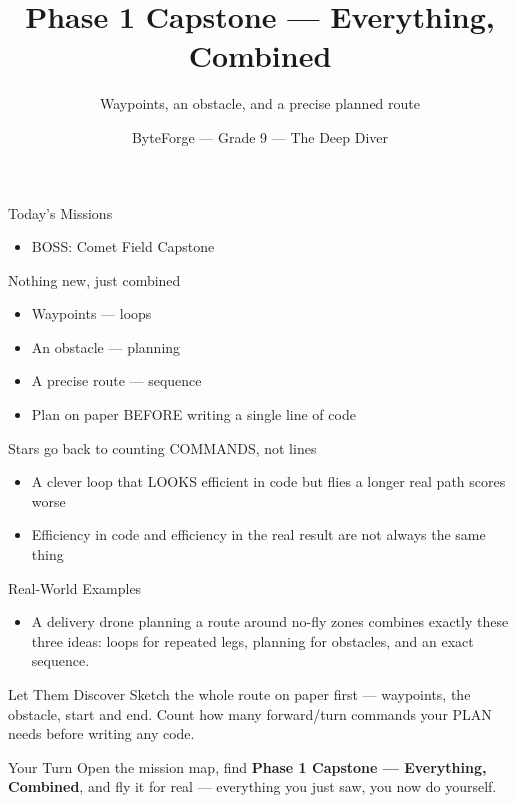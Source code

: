 \documentclass[aspectratio=169]{beamer}
\title{Phase 1 Capstone — Everything, Combined}
\subtitle{Waypoints, an obstacle, and a precise planned route}
\author{ByteForge --- Grade 9 --- The Deep Diver}
\date{}
\begin{document}
\begin{frame}
    \titlepage
\end{frame}

\begin{frame}{Today's Missions}
    \Large
    \begin{itemize}
        \item BOSS: Comet Field Capstone
    \end{itemize}
\end{frame}

\begin{frame}{Nothing new, just combined}
    \large
    \begin{itemize}
        \item Waypoints --- loops
        \item An obstacle --- planning
        \item A precise route --- sequence
        \item Plan on paper BEFORE writing a single line of code
    \end{itemize}
\end{frame}


\begin{frame}{Stars go back to counting COMMANDS, not lines}
    \large
    \begin{itemize}
        \item A clever loop that LOOKS efficient in code but flies a longer real path scores worse
        \item Efficiency in code and efficiency in the real result are not always the same thing
    \end{itemize}
\end{frame}

\begin{frame}{Real-World Examples}
    \large
    \begin{itemize}
        \item A delivery drone planning a route around no-fly zones combines exactly these three ideas: loops for repeated legs, planning for obstacles, and an exact sequence.
    \end{itemize}
\end{frame}


\begin{frame}{Let Them Discover}
    \large
    Sketch the whole route on paper first --- waypoints, the obstacle, start and end. Count how many forward/turn commands your PLAN needs before writing any code.
\end{frame}

\begin{frame}{Your Turn}
    \Large
    Open the mission map, find \textbf{Phase 1 Capstone — Everything, Combined}, and fly it for real ---
    everything you just saw, you now do yourself.
\end{frame}
\end{document}
